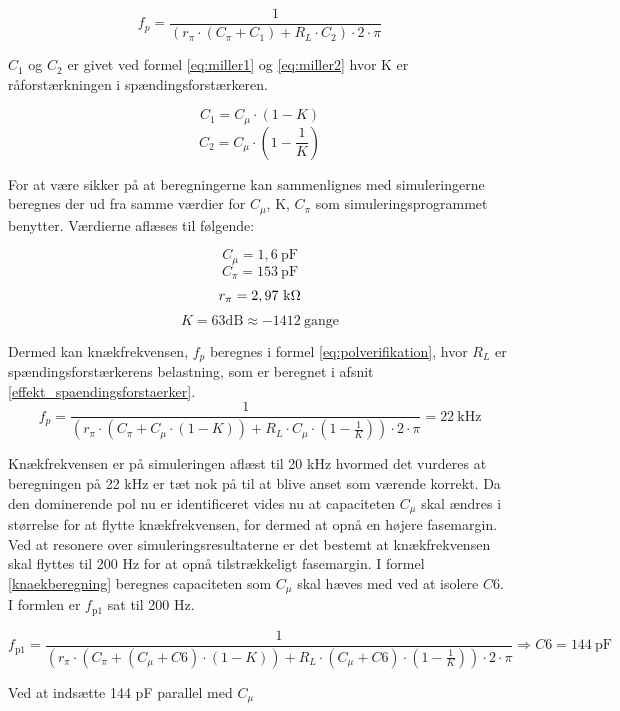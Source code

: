 \begin{equation}
f_p=\frac{1}{(r_\pi \cdot (C_\pi + C_1) + R_L \cdot C_2) \cdot 2 \cdot \pi}
\label{eq:knaekberegning_openloop}
\end{equation}

$C_1$ og $C_2$ er givet ved formel \ref{eq:miller1} og \ref{eq:miller2} hvor K er råforstærkningen i spændingsforstærkeren.

\begin{equation}
C_1=C_\mu \cdot \left( 1-K \right)
\label{eq:miller1}
\end{equation}
\begin{equation}
C_2=C_\mu \cdot \left( 1-\frac{1}{K} \right)
\label{eq:miller2}
\end{equation}

For at være sikker på at beregningerne kan sammenlignes med simuleringerne beregnes der ud fra samme værdier for $C_\mu$, K, $C_\pi$ som simuleringsprogrammet benytter. Værdierne aflæses til følgende: 

\[ C_\mu=1,6~\mathrm{pF} \]
\[ C_\pi=153~\mathrm{pF} \]
\[ r_\pi=2,97~\mathrm{k}\ohm \]
\[ K=63 \mathrm{dB} \approx -1412~\mathrm{gange}\]

Dermed kan knækfrekvensen, $f_p$ beregnes i formel \ref{eq:polverifikation}, hvor $R_L$ er spændingsforstærkerens belastning, som er beregnet i afsnit \ref{effekt_spaendingsforstaerker}.
\begin{equation}
f_p=\frac{1}{(r_\pi \cdot (C_\pi + C_\mu \cdot \left( 1-K \right)) + R_L \cdot C_\mu \cdot \left( 1-\frac{1}{K} \right)) \cdot 2 \cdot \pi}=22~\mathrm{kHz}
\label{eq:polverifikation}
\end{equation}

Knækfrekvensen er på simuleringen aflæst til 20 kHz hvormed det vurderes at beregningen på 22 kHz er tæt nok på til at blive anset som værende korrekt. 
Da den dominerende pol nu er identificeret vides nu at capaciteten $C_\mu$ skal ændres i størrelse for at flytte knækfrekvensen, for dermed at opnå en højere fasemargin. Ved at resonere over simuleringsresultaterne er det bestemt at knækfrekvensen skal flyttes til 200 Hz for at opnå tilstrækkeligt fasemargin. I formel \ref{knaekberegning} beregnes capaciteten som $C_\mu$ skal hæves med ved at isolere $C6$. I formlen er $f_\mathrm{p1}$ sat til 200 Hz. 

\begin{equation}
f_\mathrm{p1}=\frac{1}{(r_\pi \cdot (C_\pi + (C_\mu + C6) \cdot \left( 1-K \right)) + R_L \cdot (C_\mu + C6) \cdot \left( 1-\frac{1}{K} \right)) \cdot 2 \cdot \pi} \Rightarrow C6=144~\mathrm{pF}
\label{knaekberegning}
\end{equation}

Ved at indsætte 144 pF parallel med $C_\mu$